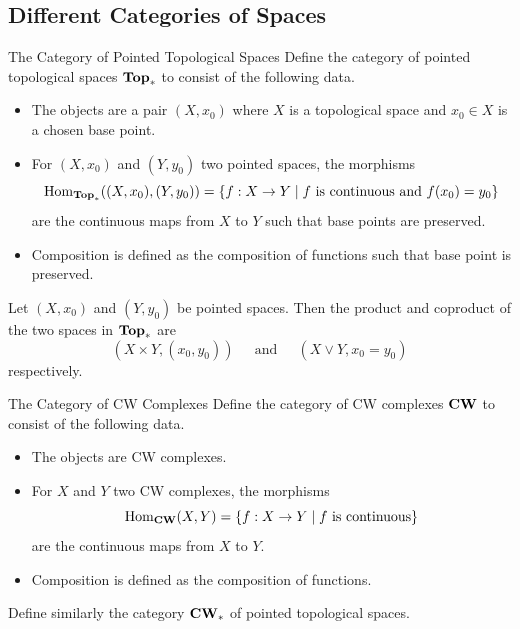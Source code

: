 \documentclass[a4paper]{article}
\begin{document}
\subsection{Different Categories of Spaces}
\begin{defn}{The Category of Pointed Topological Spaces}{} Define the category of pointed topological spaces $\bold{Top}_\ast$ to consist of the following data. 
\begin{itemize}
\item The objects are a pair $(X,x_0)$ where $X$ is a topological space and $x_0\in X$ is a chosen base point. 
\item For $(X,x_0)$ and $(Y,y_0)$ two pointed spaces, the morphisms $$\operatorname{Hom}_{\bold{Top}_\ast}((X,x_0),(Y,y_0))=\{f:X\to Y\;|\;f\text{ is continuous and }f(x_0)=y_0\}$$ are the continuous maps from $X$ to $Y$ such that base points are preserved. 
\item Composition is defined as the composition of functions such that base point is preserved. 
\end{itemize}
\end{defn}

\begin{prp}{}{} Let $(X,x_0)$ and $(Y,y_0)$ be pointed spaces. Then the product and coproduct of the two spaces in $\bold{Top}_\ast$ are $$(X\times Y,(x_0,y_0))\;\;\;\;\text{ and }\;\;\;\;(X\vee Y,x_0=y_0)$$ respectively. 
\end{prp}

\begin{defn}{The Category of CW Complexes}{} Define the category of CW complexes $\bold{CW}$ to consist of the following data. 
\begin{itemize}
\item The objects are CW complexes. 
\item For $X$ and $Y$ two CW complexes, the morphisms $$\operatorname{Hom}_{\bold{CW}}(X,Y)=\{f:X\to Y\;|\;f\text{ is continuous}\}$$ are the continuous maps from $X$ to $Y$. 
\item Composition is defined as the composition of functions. 
\end{itemize}
Define similarly the category $\bold{CW}_\ast$ of pointed topological spaces. 
\end{defn}
\end{document}
